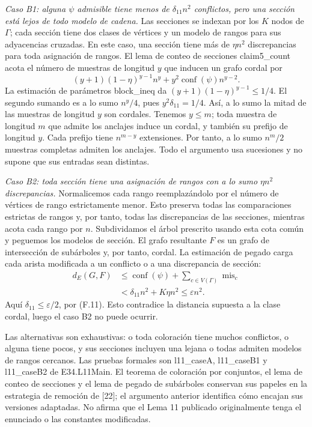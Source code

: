 \documentclass[spanish,11pt,a4paper]{article}
\begin{document}
\emph{Caso B1: alguna \(\psi\) admisible tiene menos de \(\delta_{11}n^2\) conflictos, pero una sección está lejos de todo modelo de cadena.} Las secciones se indexan por los \(K\) nodos de \(\Gamma\); cada sección tiene dos clases de vértices y un modelo de rangos para sus adyacencias cruzadas. En este caso, una sección tiene más de \(\eta n^2\) discrepancias para toda asignación de rangos. El lema de conteo de secciones {\ttfamily\small claim5\_\discretionary{\hbox{\ensuremath{\hookrightarrow}}}{}{}count} acota el número de muestras de longitud \(y\) que inducen un grafo cordal por \[
(y+1)(1-\eta)^{y-1}n^y+
y^2\operatorname{conf}(\psi)n^{y-2}.
\] La estimación de parámetros {\ttfamily\small block\_\discretionary{\hbox{\ensuremath{\hookrightarrow}}}{}{}ineq} da \((y+1)(1-\eta)^{y-1}\le1/4\). El segundo sumando es a lo sumo \(n^y/4\), pues \(y^2\delta_{11}=1/4\). Así, a lo sumo la mitad de las muestras de longitud \(y\) son cordales. Tenemos \(y\le m\); toda muestra de longitud \(m\) que admite los anclajes induce un cordal, y también su prefijo de longitud \(y\). Cada prefijo tiene \(n^{m-y}\) extensiones. Por tanto, a lo sumo \(n^m/2\) muestras completas admiten los anclajes. Todo el argumento usa sucesiones y no supone que sus entradas sean distintas.

\emph{Caso B2: toda sección tiene una asignación de rangos con a lo sumo \(\eta n^2\) discrepancias.} Normalicemos cada rango reemplazándolo por el número de vértices de rango estrictamente menor. Esto preserva todas las comparaciones estrictas de rangos y, por tanto, todas las discrepancias de las secciones, mientras acota cada rango por \(n\). Subdividamos el árbol prescrito usando esta cota común y peguemos los modelos de sección. El grafo resultante \(F\) es un grafo de intersección de subárboles y, por tanto, cordal. La estimación de pegado carga cada arista modificada a un conflicto o a una discrepancia de sección: \[
\begin{aligned}
d_E(G,F)&\le\operatorname{conf}(\psi)+
             \sum_{c\in V(\Gamma)}\operatorname{mis}_c\\
&<\delta_{11}n^2+K\eta n^2
\le\varepsilon n^2.
\end{aligned}
\tag{F.12}
\] Aquí \(\delta_{11}\le\varepsilon/2\), por (F.11). Esto contradice la distancia supuesta a la clase cordal, luego el caso B2 no puede ocurrir.

Las alternativas son exhaustivas: o toda coloración tiene muchos conflictos, o alguna tiene pocos, y sus secciones incluyen una lejana o todas admiten modelos de rangos cercanos. Las pruebas formales son {\ttfamily\small l11\_\discretionary{\hbox{\ensuremath{\hookrightarrow}}}{}{}caseA}, {\ttfamily\small l11\_\discretionary{\hbox{\ensuremath{\hookrightarrow}}}{}{}caseB1} y {\ttfamily\small l11\_\discretionary{\hbox{\ensuremath{\hookrightarrow}}}{}{}caseB2} de E34.L11Main. El teorema de coloración por conjuntos, el lema de conteo de secciones y el lema de pegado de subárboles conservan sus papeles en la estrategia de remoción de {[}22{]}; el argumento anterior identifica cómo encajan sus versiones adaptadas. No afirma que el Lema 11 publicado originalmente tenga el enunciado o las constantes modificadas.
\end{document}
